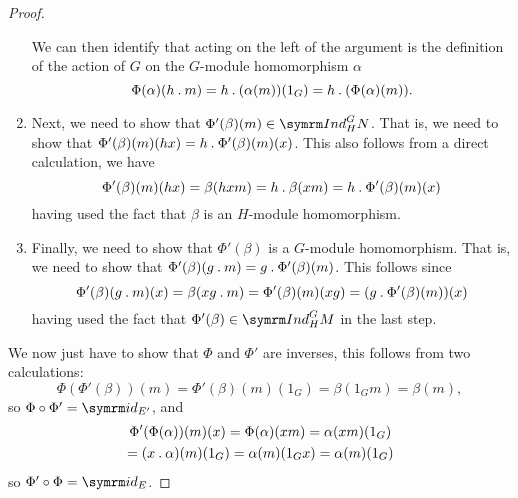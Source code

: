 \begin{thm}{}{}
\begin{proof}
\begin{enumerate}
            We can then identify that acting on the left of the argument is the definition of the action of \(G\) on the \(G\)-module homomorphism \(\alpha\)
            \begin{equation}
                \Phi(\alpha)(h \mathbin{.} m) = h \mathbin{.} (\alpha (m))(1_G) = h \mathbin{.} (\Phi(\alpha)(m)).
            \end{equation}
            \item Next, we need to show that \(\Phi'(\beta)(m) \in \Ind^G_HN\).
            That is, we need to show that \(\Phi'(\beta)(m)(hx) = h \mathbin{.} \Phi'(\beta)(m)(x)\).
            This also follows from a direct calculation, we have
            \begin{equation}
                \Phi'(\beta)(m)(hx) = \beta(hxm) = h \mathbin{.} \beta(xm) = h \mathbin{.} \Phi'(\beta)(m)(x)
            \end{equation}
            having used the fact that \(\beta\) is an \(H\)-module homomorphism.
            \item Finally, we need to show that \(\Phi'(\beta)\) is a \(G\)-module homomorphism.
            That is, we need to show that \(\Phi'(\beta)(g \mathbin{.} m) = g \mathbin{.} \Phi'(\beta)(m)\).
            This follows since
            \begin{equation}
                \Phi'(\beta)(g \mathbin{.} m)(x) = \beta(xg \mathbin{.} m) = \Phi'(\beta)(m)(xg) = (g \mathbin{.} \Phi'(\beta)(m))(x)
            \end{equation}
            having used the fact that \(\Phi'(\beta) \in \Ind^G_H M\) in the last step.
        \end{enumerate}
        
        We now just have to show that \(\Phi\) and \(\Phi'\) are inverses, this follows from two calculations:
        \begin{equation}
            \Phi(\Phi'(\beta))(m) = \Phi'(\beta)(m)(1_G) = \beta(1_Gm) = \beta(m),
        \end{equation}
        so \(\Phi \circ \Phi' = \id_{E'}\), and
        \begin{multline}
            \Phi'(\Phi(\alpha))(m)(x) = \Phi(\alpha)(xm) = \alpha(xm)(1_G)\\
            = (x \mathbin{.} \alpha)(m)(1_G) = \alpha(m)(1_Gx) = \alpha(m)(1_G)
        \end{multline}
        so \(\Phi' \circ \Phi = \id_E\).
    \end{proof}
\end{thm}